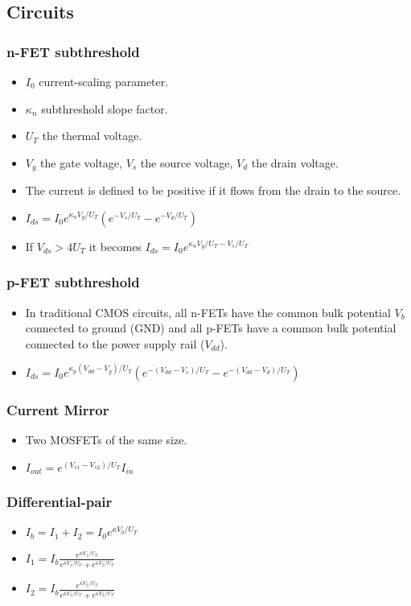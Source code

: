 \documentclass[main]{subfiles}
\begin{document}
\subsection{Circuits}
\subsubsection{n-FET subthreshold}
\begin{itemize}[noitemsep,nolistsep]
	\item $I_0$ current-scaling parameter.
	\item $\kappa_n$ subthreshold slope factor.
	\item $U_T$ the thermal voltage.
	\item $V_g$ the gate voltage, $V_s$ the source voltage, $V_d$ the drain voltage.
	\item The current is defined to be positive if it flows from the drain to the source.
	\item $I_{ds} = I_0e^{\kappa_nV_g/U_T}(e^{-V_s/U_T}-e^{-V_d/U_T})$
	\item If $V_{ds} > 4U_T$ it becomes $I_{ds} = I_0e^{\kappa_nV_g/U_T-V_s/U_T}$
\end{itemize}

\subsubsection{p-FET subthreshold}
\begin{itemize}[noitemsep,nolistsep]
	\item In traditional CMOS circuits, all n-FETs have the common bulk potential $V_b$ connected to ground (GND) and all p-FETs have a common bulk potential connected to the power supply rail ($V_{dd}$).
	\item $I_{ds}=I_0e^{\kappa_p(V_{dd}-V_g)/U_T}(e^{-(V_{dd}-V_s)/U_T}-e^{-(V_{dd}-V_d)/U_T})$
\end{itemize}

\subsubsection{Current Mirror}
\begin{itemize}[noitemsep,nolistsep]
	\item Two MOSFETs of the same size.
	\item $I_{out}=e^{(V_{s1}-V_{s2})/U_T}I_{in}$
\end{itemize}

\subsubsection{Differential-pair}
\begin{itemize}[noitemsep,nolistsep]
	\item $I_b=I_1+I_2=I_0e^{\kappa V_b/U_T}$
	\item $I_1=I_b\frac{e^{\kappa V_1/U_T}}{e^{\kappa V_1/U_T}+e^{\kappa V_2/U_T}}$
	\item $I_2=I_b\frac{e^{\kappa V_2/U_T}}{e^{\kappa V_1/U_T}+e^{\kappa V_2/U_T}}$
\end{itemize}
\end{document}
